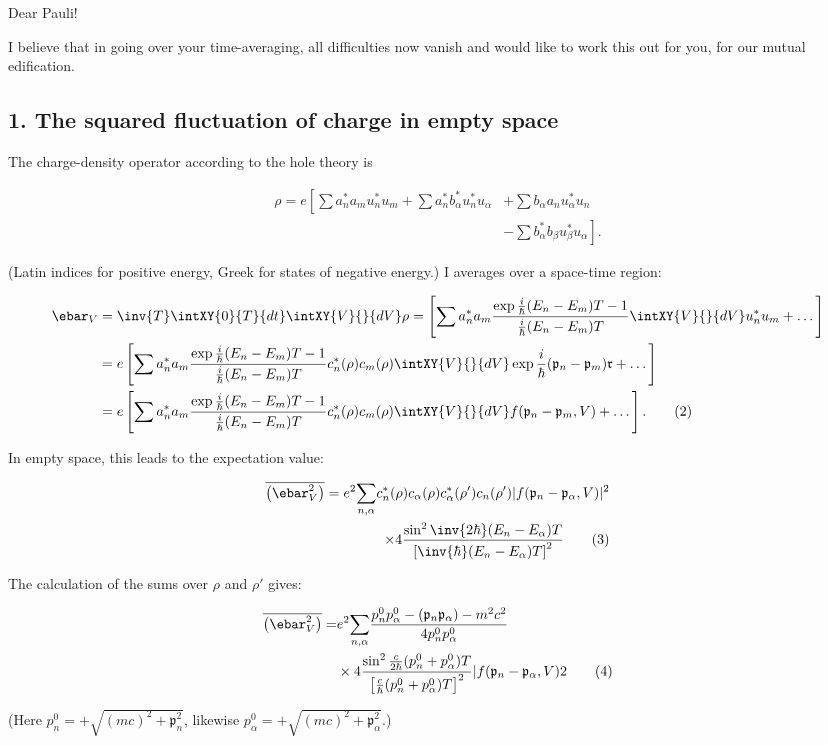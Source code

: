 \documentclass{article}
\newcommand{\nf}[2]{
\newcommand{#1}[1]{#2}
}
\newcommand{\nc}[2]{
  \newcommand{#1}{#2}
}
\newcommand{\nequ}[2]{
\begin{align*}
#1
\tag{#2}
\end{align*}
}
\newcommand{\sumX}[1]{\underset{#1}{\sum}}
\begin{document}
Dear Pauli!

I believe that in going over your time-averaging, all difficulties now vanish and would like to work this out for you, for our mutual edification.

\subsection*{1. The squared fluctuation of charge in empty space}

The charge-density operator according to the hole theory is
\nequ{
\rho = e\left[
    \sum a^*_n a_m u^*_n u_m
  + \sum a^*_n b^*_\alpha u^*_n u_\alpha\right.
  &+ \sum b_\alpha a_n u^*_\alpha u_n\\
  &\left.- \sum b^*_\alpha b_\beta u^*_\beta u_\alpha
\right].
}{1}
(Latin indices for positive energy, Greek for states of negative energy.) I averages over a space-time region:

\nf{\MF}{\mathfrak{#1}}
\nc{\fp}{\MF{p}}
\nc{\fr}{\MF{r}}

\nequ{
\ebar_V &= \inv{T}\intXY{0}{T}{dt}\intXY{V}{}{dV} 
    \rho = \left[\sum a^*_n a_m 
    \frac{\exp{\frac{i}{\hbar}(E_n-E_m)T} - 1}{\frac{i}{\hbar}(E_n - E_m)T}
    \intXY{V}{}{dV}u^*_n u_m + \dots
    \right]\\
 &= e\left[\sum a^*_n a_m 
    \frac{\exp{\frac{i}{\hbar}(E_n-E_m)T} - 1}{\frac{i}{\hbar}(E_n - E_m)T}
    c^*_n(\rho)c_m(\rho)
    \intXY{V}{}{dV}\exp{\frac{i}{\hbar}(\fp_n - \fp_m)\fr} + \dots
    \right]\\
 &= e\left[\sum a^*_n a_m 
    \frac{\exp{\frac{i}{\hbar}(E_n-E_m)T} - 1}{\frac{i}{\hbar}(E_n - E_m)T}
    c^*_n(\rho)c_m(\rho)
    \intXY{V}{}{dV}f(\fp_n - \fp_m, V) + \dots
    \right].
}{2}
In empty space, this leads to the expectation value:
\nequ{
\overline{\left(\ebar^2_V\right)} = e^2 
  \sumX{n,\alpha}c_n^*(\rho)c_\alpha(\rho)c^*_\alpha(\rho')c_n(\rho')
  |f(\fp_n - \fp_\alpha, V)|^2\\
\times 4\frac{\sin^2{\inv{2\hbar}(E_n-E_\alpha)T}}{\left[\inv{\hbar}(E_n - E_\alpha)T\right]^2}
}{3}
The calculation of the sums over $\rho$ and $\rho'$ gives:
\nequ{
\overline{\left(\ebar^2_V\right)} = &e^2 \sumX{n,\alpha}
    \frac{p_n^0 p_\alpha^0 - (\fp_n \fp_\alpha) - m^2 c^2}{4p^0_n p^0_\alpha}\\
&\times 4\frac{\sin^2{\frac{c}{2\hbar}(p^0_n + p^0_\alpha)T}}
             {\left[\frac{c}{\hbar}(p^0_n + p^0_\alpha)T\right]^2}
    |f(\fp_n - \fp_\alpha, V)2
}{4}
(Here $p^0_n = +\sqrt{(mc)^2 + \fp_n^2}$, likewise $p^0_\alpha = +\sqrt{(mc)^2 + \fp_\alpha^2}$.)
\end{document}
